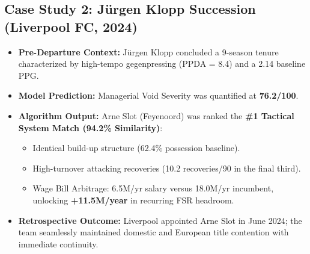 \documentclass[10pt,journal,compsoc]{IEEEtran}
\begin{document}
\subsection{Case Study 2: J{\"u}rgen Klopp Succession (Liverpool FC, 2024)}
\begin{itemize}
    \item \textbf{Pre-Departure Context:} J{\"u}rgen Klopp concluded a 9-season tenure characterized by high-tempo gegenpressing (PPDA = 8.4) and a 2.14 baseline PPG.
    \item \textbf{Model Prediction:} Managerial Void Severity was quantified at \textbf{76.2/100}.
    \item \textbf{Algorithm Output:} Arne Slot (Feyenoord) was ranked the \textbf{\#1 Tactical System Match (94.2\% Similarity)}:
    \begin{itemize}
        \item Identical build-up structure (62.4\% possession baseline).
        \item High-turnover attacking recoveries (10.2 recoveries/90 in the final third).
        \item Wage Bill Arbitrage: \texteuro6.5M/yr salary versus \texteuro18.0M/yr incumbent, unlocking \textbf{+\texteuro11.5M/year} in recurring FSR headroom.
    \end{itemize}
    \item \textbf{Retrospective Outcome:} Liverpool appointed Arne Slot in June 2024; the team seamlessly maintained domestic and European title contention with immediate continuity.
\end{itemize}
\end{document}
